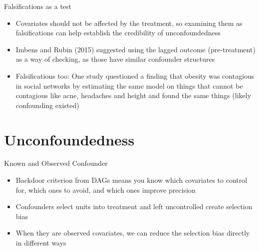\documentclass{beamer}
\begin{document}
\begin{frame}{Falsifications as a test}

\begin{itemize}
\item Covariates should not be affected by the treatment, so examining them as falsifications can help establish the credibility of unconfoundedness
\item Imbens and Rubin (2015) suggested using the lagged outcome (pre-treatment) as a way of checking, as those have similar confounder structures
\item Falsifications too: One study questioned a finding that obesity was contagious in social networks by estimating the same model on things that cannot be contagious like acne, headaches and height and found the same things (likely confounding existed)
\end{itemize}

\end{frame}




\section{Unconfoundedness}




\begin{frame}{Known and Observed Confounder}

	\begin{itemize}
	\item Backdoor criterion from DAGs means you know which covariates to control for, which ones to avoid, and which ones improve precision
	\item Confounders select units into treatment and left uncontrolled create selection bias
	\item When they are observed covariates, we can reduce the selection bias directly in different ways
	\end{itemize}

\end{frame}
\end{document}
